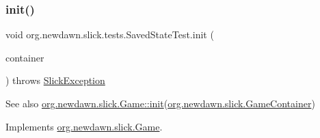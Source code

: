\mbox{\label{classorg_1_1newdawn_1_1slick_1_1tests_1_1_saved_state_test_afe29a8dbe96c8294453f8124f19534e3}} 
\subsubsection{\texorpdfstring{init()}{init()}}
{\footnotesize\ttfamily void org.\+newdawn.\+slick.\+tests.\+Saved\+State\+Test.\+init (\begin{DoxyParamCaption}\item[{\mbox{\hyperlink{classorg_1_1newdawn_1_1slick_1_1_game_container}{Game\+Container}}}]{container }\end{DoxyParamCaption}) throws \mbox{\hyperlink{classorg_1_1newdawn_1_1slick_1_1_slick_exception}{Slick\+Exception}}\hspace{0.3cm}{\ttfamily [inline]}}

\begin{DoxySeeAlso}{See also}
\mbox{\hyperlink{interfaceorg_1_1newdawn_1_1slick_1_1_game_ad2dd6affab08bb8fdb5fab0815957b7a}{org.\+newdawn.\+slick.\+Game\+::init}}(\mbox{\hyperlink{classorg_1_1newdawn_1_1slick_1_1_game_container}{org.\+newdawn.\+slick.\+Game\+Container}}) 
\end{DoxySeeAlso}


Implements \mbox{\hyperlink{interfaceorg_1_1newdawn_1_1slick_1_1_game_ad2dd6affab08bb8fdb5fab0815957b7a}{org.\+newdawn.\+slick.\+Game}}.


